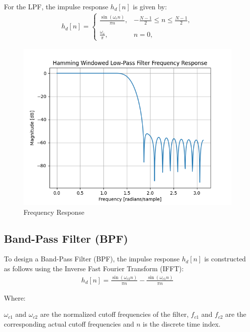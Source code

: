 \documentclass{article}
\begin{document}
For the LPF, the impulse response $ h_d[n]$ is given by:
\begin{align}
h_d[n] = \begin{cases}
    \frac{\sin(\omega_c n)}{\pi  n}, &  -\frac{N - 1}{2} \leq n \leq \frac{N - 1}{2}, \\
    \\
    \frac{\omega_c}{\pi}, &  n = 0,
\end{cases} \nonumber
\end{align}
\begin{figure}[ht]
  \centering
  \includegraphics[scale=0.8]{./dsp/figs/lpf.png}
  \caption{Frequency Response}
  \label{fig:lpf}
\end{figure}
\begin{center}
\end{center}
\subsection{Band-Pass Filter (BPF)}
To design a Band-Pass Filter (BPF), the impulse response \( h_d[n] \) is constructed as follows using the Inverse Fast Fourier Transform (IFFT):
\begin{align}
h_d[n] = \frac{{\sin(\omega_{c2} n)}}{\pi n} - \frac{{\sin(\omega_{c1} n)}}{\pi n}
\end{align}



Where:

   \(\omega_{c1}\) and \(\omega_{c2}\) are the normalized cutoff frequencies of the filter,
   \(f_{c1}\) and \(f_{c2}\) are the corresponding actual cutoff frequencies and
   \(n\) is the discrete time index.
\end{document}
